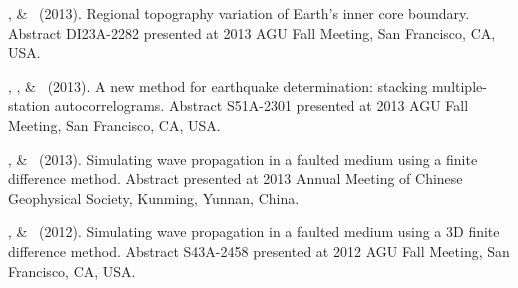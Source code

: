 \begin{etaremune}
    \Me, \& \LWen\ (2013).
    Regional topography variation of Earth's inner core boundary.
    Abstract DI23A-2282 presented at 2013 AGU Fall Meeting, San Francisco, CA, USA.
\item
    \MZhang, \Me, \& \LWen\ (2013).
    A new method for earthquake determination: stacking multiple-station autocorrelograms.
    Abstract S51A-2301 presented at 2013 AGU Fall Meeting, San Francisco, CA, USA.
\item
    \Me, \& \LWen\ (2013).
    Simulating wave propagation in a faulted medium using a finite difference method.
    Abstract presented at 2013 Annual Meeting of Chinese Geophysical Society, Kunming, Yunnan, China.
\item
    \Me, \& \LWen\ (2012).
    Simulating wave propagation in a faulted medium using a 3D finite difference method.
    Abstract S43A-2458 presented at 2012 AGU Fall Meeting, San Francisco, CA, USA.
\end{etaremune}
